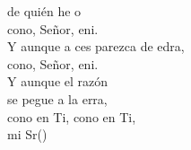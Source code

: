 \begin{cancion}[Confío][Ixcís]%
	 de quién he o \\
	cono, Señor, eni. \\
	Y aunque a ces parezca de edra,\\
	cono, Señor, eni. \\
	Y aunque el razón\\
	se pegue a la erra,\\
	cono en Ti, cono en Ti,   \\
	mi Sr()\\
\end{cancion}%
